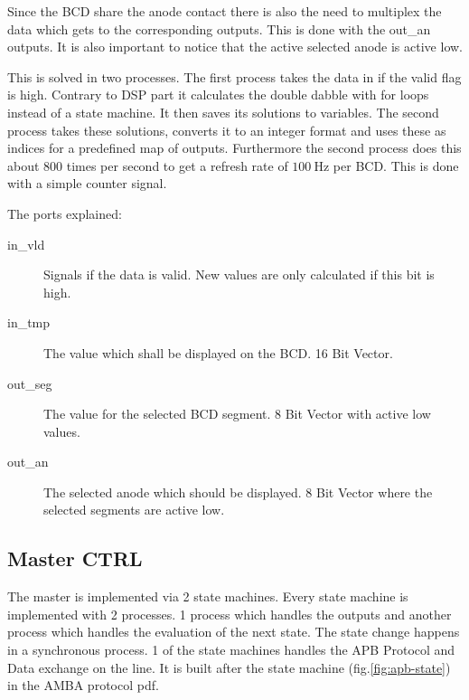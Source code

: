 \documentclass[%
	a4paper,
]
{article}
\begin{document}
Since the BCD share the anode contact there is also the need to multiplex the data which gets
to the corresponding outputs. This is done with the out\_an outputs. It is also important to notice
that the active selected anode is active low.

This is solved in two processes. The first process takes the data in if the valid flag is high. Contrary to 
DSP part it calculates the double dabble with for loops instead of a state machine. It then saves its
solutions to variables. The second process takes these solutions, converts it to an integer format and
uses these as indices for a predefined map of outputs. Furthermore the second process does this about
800 times per second to get a refresh rate of $100~\text{Hz}$ per BCD. This is done with a simple counter signal.

The ports explained:
\begin{description}
\item[in\_vld] Signals if the data is valid. New values are only calculated if this bit is high.
\item[in\_tmp] The value which shall be displayed on the BCD. 16 Bit Vector.
\item[out\_seg] The value for the selected BCD segment. 8 Bit Vector with active low values.
\item[out\_an] The selected anode which should be displayed. 8 Bit Vector where the selected segments
are active low.
\end{description}


\subsection{Master CTRL}
The master is implemented via 2 state machines. 
Every state machine is implemented with 2 processes. 1 process
which handles the outputs and another process which handles
the evaluation of the next state. The state change happens in
a synchronous process.
1 of the state
machines handles the APB Protocol and Data exchange on the line. 
It is built after the state machine (fig.\ref{fig:apb-state}) in the AMBA protocol pdf.
\end{document}
